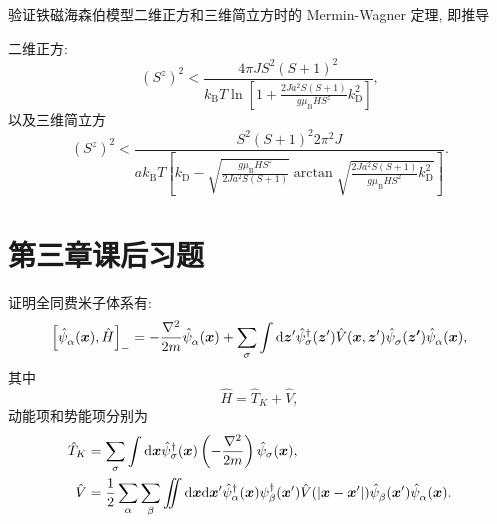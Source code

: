 \begin{question2}{}{}
验证铁磁海森伯模型二维正方和三维简立方时的 Mermin-Wagner 定理, 即推导

二维正方:
\begin{equation}
\left(S^{z}\right)^{2}<\frac{4 \pi J S^{2}(S+1)^{2}}{k_{\mathrm{B}} T \ln \left[1+\frac{2 J a^{2} S(S+1)}{g \mu_{\mathrm{B}} H S^{z}} k^2_{\mathrm{D}}\right]} ,
\end{equation}
以及三维简立方
\begin{equation}
\left(S^{z}\right)^{2}<\frac{S^{2}(S+1)^{2} 2 \pi^{2} J}{a k_{\mathrm{B}} T\left[k_{\mathrm{D}}-\sqrt{\frac{g \mu_{\mathrm{B}} H S^{z}}{2 J a^{2} S(S+1)}} \arctan \sqrt{\frac{2J a^{2} S(S+1) }{g \mu_{\mathrm{B}} H S^{2}}k_{\mathrm{D}}^{2}}\right]} .
\end{equation}
\end{question2}
\section{第三章课后习题}
\begin{question2}{}{}
    证明全同费米子体系有:
    \begin{equation}
           \left[ \hat\psi^{ }_\alpha(\boldsymbol{x}),\hat{H} \right]_-= -\frac{\nabla^2}{2m} \hat{\psi}^{ }_\alpha(\boldsymbol{x})+\sum_\sigma\int\mathrm{d}\boldsymbol{z}' \hat{\psi}_\sigma^\dagger(\boldsymbol{z}') \hat{V}(\boldsymbol{x},\boldsymbol{z}')\hat{\psi}^{ }_\sigma(\boldsymbol{z'})\hat{\psi}^{ }_\alpha(\boldsymbol{x}),
    \end{equation}
    其中 
    \begin{equation}
        \hat{H}=\hat{T}_{K}+\hat{V},
    \end{equation}
    动能项和势能项分别为
     \begin{align}
            \hat{T}_{K}&=\sum_{\sigma}\int\mathrm{d}\boldsymbol{x}\hat{\psi}_\sigma^\dagger(\boldsymbol{x})\left( -\frac{\nabla^2}{2m} \right) \hat{\psi}_\sigma(\boldsymbol{x}),\\
            \hat{V}&=\frac{1}{2}\sum_\alpha\sum_\beta\iint\mathrm{d}\boldsymbol{x}\mathrm{d}\boldsymbol{x}'\hat{\psi}_\alpha^\dagger(\boldsymbol{x})\psi_\beta^\dagger(\boldsymbol{x}')\hat{V}(|\boldsymbol{x}-\boldsymbol{x}'|)\hat{\psi}_{\beta}^{ }(\boldsymbol{x}')\hat{\psi}_\alpha^{ }(\boldsymbol{x}).
        \end{align}
\end{question2}

